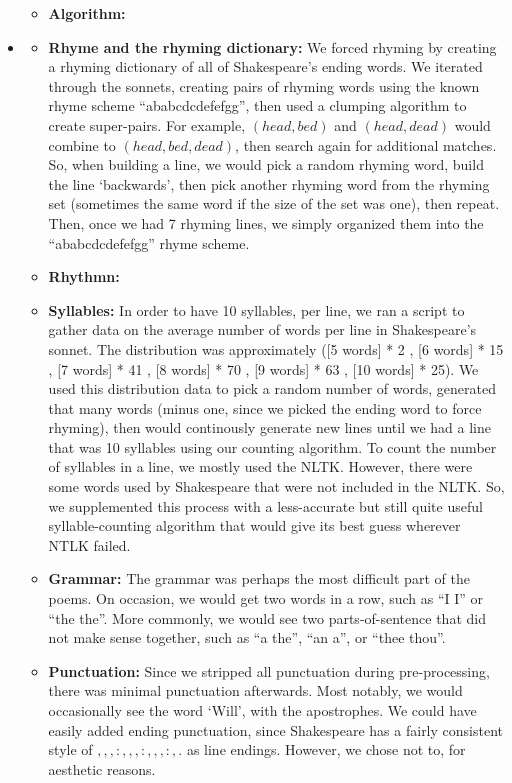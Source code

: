 \begin{itemize}
\begin{itemize}
    \item \textbf{Algorithm:}


    \end{itemize}

    \item {}
    \begin{itemize}
        \item \textbf{Rhyme and the rhyming dictionary:} We forced rhyming by creating a rhyming dictionary of all of Shakespeare's ending words. We iterated through the sonnets, creating pairs of rhyming words using the known rhyme scheme ``ababcdcdefefgg'', then used a clumping algorithm to create super-pairs. For example, $(head, bed)$ and $(head, dead)$ would combine to $(head,bed,dead)$, then search again for additional matches. So, when building a line, we would pick a random rhyming word, build the line `backwards', then pick another rhyming word from the rhyming set (sometimes the same word if the size of the set was one), then repeat. Then, once we had 7 rhyming lines, we simply organized them into the ``ababcdcdefefgg'' rhyme scheme.
        \item \textbf{Rhythmn:} 
        \item \textbf{Syllables:} In order to have 10 syllables, per line, we ran a script to gather data on the average number of words per line in Shakespeare's sonnet. The distribution was approximately ([5 words] * 2 , [6 words] * 15 , [7 words] * 41 , [8 words] * 70 , [9 words] * 63 , [10 words] * 25). We used this distribution data to pick a random number of words, generated that many words (minus one, since we picked the ending word to force rhyming), then would continously generate new lines until we had a line that was 10 syllables using our counting algorithm.
        To count the number of syllables in a line, we mostly used the NLTK. However, there were some words used by Shakespeare that were not included in the NLTK. So, we supplemented this process with a less-accurate but still quite useful syllable-counting algorithm that would give its best guess wherever NTLK failed.
        \item \textbf{Grammar:} The grammar was perhaps the most difficult part of the poems. On occasion, we would get two words in a row, such as ``I I'' or ``the the''. More commonly, we would see two parts-of-sentence that did not make sense together, such as ``a the'', ``an a'', or ``thee thou''.
        \item \textbf{Punctuation:} Since we stripped all punctuation during pre-processing, there was minimal punctuation afterwards. Most notably, we would occasionally see the word `Will', with the apostrophes. We could have easily added ending punctuation, since Shakespeare has a fairly consistent style of $,,,:,,,:,,,:,.$ as line endings. However, we chose not to, for aesthetic reasons.
    \end{itemize}

\end{itemize}


